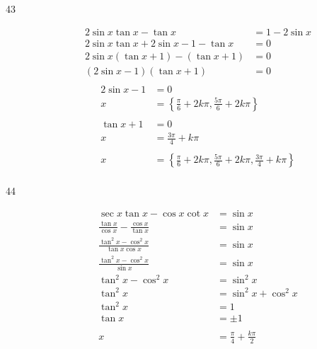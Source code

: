 \documentclass{exam}
\begin{document}
\begin{description}
      \item[43] 
        \begin{align*}
          2 \sin x \tan x - \tan x                & = 1 - 2 \sin x \\
          2 \sin x \tan x + 2 \sin x - 1 - \tan x & = 0  \\
          2 \sin x (\tan x + 1) - (\tan x + 1)    & = 0  \\
          (2 \sin x - 1) (\tan x + 1)             & = 0  \\
        \end{align*}
        \begin{align*}
          2 \sin x - 1 & = 0 \\
          x            & = \left\{ \frac{\pi}{6} + 2k \pi, \frac{5 \pi}{6} + 2k \pi \right\} \\
          \\
          \tan x + 1 & = 0 \\
          x          & = \frac{3 \pi}{4} + k \pi \\
          \\
          x & = \boxed{ \left\{ \frac{\pi}{6} + 2k \pi, \frac{5 \pi}{6} + 2k \pi, \frac{3 \pi}{4} + k \pi \right\} } \\
        \end{align*}

      \item[44] 
        \begin{align*}
          \sec x \tan x - \cos x \cot x                 & = \sin x \\
          \frac{\tan x}{\cos x} - \frac{\cos x}{\tan x} & = \sin x \\
          \frac{\tan^2 x - \cos^2 x}{\tan x \cos x}     & = \sin x \\
          \frac{\tan^2 x - \cos^2 x}{\sin x}            & = \sin x \\
          \tan^2 x - \cos^2 x                           & = \sin^2 x \\
          \tan^2 x                                      & = \sin^2 x + \cos^2 x \\
          \tan^2 x                                      & = 1 \\
          \tan x                                        & = \pm 1 \\
          \\
          x                                             & = \boxed{ \frac{\pi}{4} + \frac{k \pi}{2} } \\
        \end{align*}


\end{description}
\end{document}
